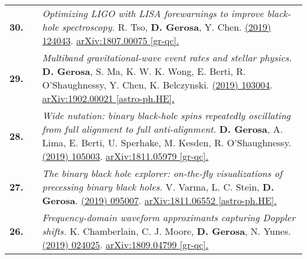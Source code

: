{\begin{longtable}{rp{0.3cm}p{15.8cm}}
%
\textbf{30.} & & \textit{Optimizing LIGO with LISA forewarnings to improve black-hole spectroscopy.}
\newline{}
R. Tso, \textbf{D. Gerosa}, Y. Chen.
\newline{}
\href{https://journals.aps.org/prd/abstract/10.1103/PhysRevD.99.124043}{\prd 99 (2019) 124043}. \href{https://arxiv.org/abs/1807.00075}{arXiv:1807.00075 [gr-qc].}
\vspace{0.09cm}\\
%
\textbf{29.} & & \textit{Multiband gravitational-wave event rates and stellar physics.}
\newline{}
\textbf{D. Gerosa}, S. Ma, K. W. K. Wong, E. Berti, R. O'Shaughnessy, Y. Chen, K. Belczynski.
\newline{}
\href{https://journals.aps.org/prd/abstract/10.1103/PhysRevD.99.103004}{\prd 99 (2019) 103004}. \href{https://arxiv.org/abs/1902.00021}{arXiv:1902.00021 [astro-ph.HE].}
\vspace{0.09cm}\\
%
\textbf{28.} & & \textit{Wide nutation: binary black-hole spins repeatedly oscillating from full alignment to full anti-alignment.}
\newline{}
\textbf{D. Gerosa}, A. Lima, E. Berti, U. Sperhake, M. Kesden, R. O'Shaughnessy.
\newline{}
\href{https://iopscience.iop.org/article/10.1088/1361-6382/ab14ae/meta}{\cqg 36 (2019) 105003}. \href{https://arxiv.org/abs/1811.05979}{arXiv:1811.05979 [gr-qc].}
\vspace{0.09cm}\\
%
\textbf{27.} & & \textit{The binary black hole explorer: on-the-fly visualizations of precessing binary black holes.}
\newline{}
V. Varma, L. C. Stein, \textbf{D. Gerosa}.
\newline{}
\href{https://iopscience.iop.org/article/10.1088/1361-6382/ab0ee9/meta}{\cqg 36 (2019) 095007}. \href{https://arxiv.org/abs/1811.06552}{arXiv:1811.06552 [astro-ph.HE].}
\vspace{0.09cm}\\
%
\textbf{26.} & & \textit{Frequency-domain waveform approximants capturing Doppler shifts.}
\newline{}
K. Chamberlain, C. J. Moore, \textbf{D. Gerosa}, N. Yunes.
\newline{}
\href{https://journals.aps.org/prd/abstract/10.1103/PhysRevD.99.024025}{\prd 99 (2019) 024025}. \href{https://arxiv.org/abs/1809.04799}{arXiv:1809.04799 [gr-qc].}
\vspace{0.09cm}\\

\end{longtable}}
